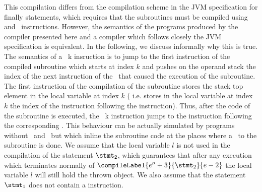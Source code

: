  

 This compilation differs from the compilation scheme in the JVM specification for finally statements, which requires that the subroutines must be compiled using  and 
 \ret \ instructions. However, the semantics of the programs produced by the compiler presented here and a compiler which follows closely the JVM specification 
 is equivalent. 
 In the following, we discuss informally why this is true.
 The semantics of a \jsr \ k insruction is to  jump to the first instruction of the compiled subroutine which starts at index $k$ and pushes on the
 operand stack the index of the next instruction of the \jsr \ that caused the execution of the subroutine. 
 The first instruction of the compilation
 of the subroutine stores the stack top element in the local variable at index $k$ ( i.e. stores in the local variable at index $k$ the
 index of the instruction following the \jsr{} instruction). Thus, after the code of the subroutine is 
 executed, the \ret \ k instruction jumps to 
 the instruction following the corresponding \jsr. This behaviour can be actually simulated by programs without \jsr \ and \ret \ but which inline the subroutine code
 at the places where a \jsr \ to the subroutine is done.
 We assume that the local variable $l$ is not used in the compilation of the statement $\stmt_2$, which guarantees that after any execution which 
 terminates normally of $\compileLabel{e'' + 3}{\stmt_2}{e - 2}$ the local variable  $l$ will still hold the thrown object. We also assume that the 
 statement $\stmt_1$ does not contain a \return{} instruction. 




